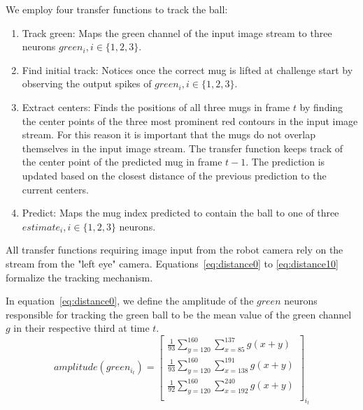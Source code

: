 \documentclass[conference]{IEEEtran}
\begin{document}
We employ four transfer functions to track the ball:
\begin{enumerate}

	\item Track green: Maps the green channel of the input image stream to three neurons $green_i, i\in\{1,2,3\}$. 
	\item Find initial track: Notices once the correct mug is lifted at challenge start by observing the output spikes of  $green_i, i\in\{1,2,3\}$.
	\item Extract centers: Finds the positions of all three mugs in frame $t$ by finding the center points of the three most prominent red contours in the input image stream. For this reason it is important that the mugs do not overlap themselves in the input image stream. The transfer function keeps track of the center point of the predicted mug in frame $t-1$. The prediction is updated based on the closest distance of the previous prediction to the current centers.
	\item Predict: Maps the mug index predicted to contain the ball to one of three $estimate_i,  i\in\{1,2,3\}$ neurons.
\end{enumerate}

All transfer functions requiring image input from the robot camera rely on the stream from the "left eye" camera. Equations~\eqref{eq:distance0} to \eqref{eq:distance10} formalize the tracking mechanism.

In equation~\eqref{eq:distance0}, we define the amplitude of the $green$ neurons  responsible for tracking the green ball to be the mean value of the green channel $g$ in their respective third at time $t$.
\begin{equation}
amplitude(green_{i_t}) = \begin{bmatrix}
           \frac{1}{93}\sum\limits_{y=120}^{160}\sum\limits_{x=85}^{137}g(x+y) \\
           \frac{1}{93}\sum\limits_{y=120}^{160}\sum\limits_{x=138}^{191}g(x+y) \\
           \frac{1}{92}\sum\limits_{y=120}^{160}\sum\limits_{x=192}^{240}g(x+y) \\
         \end{bmatrix}_{i_t}  \label{eq:distance0}
\end{equation}
       
\end{document}
